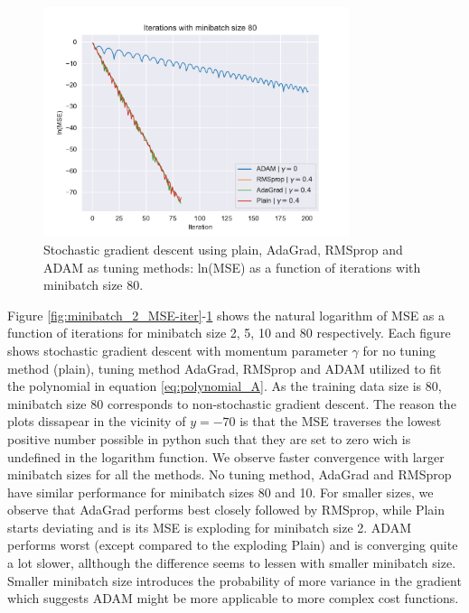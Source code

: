 \begin{figure}[H]
\centering
\includegraphics[width=0.8\textwidth]{Figures/PartA/minibatch_80_MSE(iter).pdf}
\caption{Stochastic gradient descent using plain, AdaGrad, RMSprop and ADAM as tuning methods: ln(MSE) as a function of iterations with minibatch size 80.}
\label{fig:minibatch_80_MSE-iter}
\end{figure}

Figure \ref{fig:minibatch_2_MSE-iter}-\ref{fig:minibatch_80_MSE-iter} shows the natural logarithm of MSE as a function of iterations
for minibatch size 2, 5, 10 and 80 respectively. Each figure shows stochastic gradient descent with momentum parameter $\gamma $ for no tuning method (plain),
tuning method AdaGrad, RMSprop and ADAM utilized to fit the polynomial in equation \ref{eq:polynomial_A}. As the training data 
size is 80, minibatch size 80 corresponds to non-stochastic gradient descent. The reason the plots dissapear in the vicinity of $y=-70$ 
is that the MSE traverses the lowest positive number possible in python such that they are set to zero wich is undefined in the logarithm function. 
We observe faster convergence with larger minibatch sizes for all the methods. No tuning method, AdaGrad and RMSprop have similar performance for minibatch 
sizes 80 and 10. For smaller sizes, we observe that AdaGrad performs best closely followed by RMSprop, while Plain starts deviating and is its MSE is 
exploding for minibatch size 2. ADAM performs worst (except compared to the exploding Plain) and is converging quite a lot slower, allthough the difference 
seems to lessen with smaller minibatch size. Smaller minibatch size introduces the probability of more variance in the gradient which suggests ADAM might be more 
applicable to more complex cost functions.   

